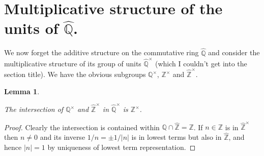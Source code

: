 \documentclass[10pt,a4paper]{article}
\newcommand{\Z}{\mathbb{Z}}
\newcommand{\Q}{\mathbb{Q}}
\newcommand{\Qhat}{\widehat{\Q}}
\newcommand{\Zhat}{\widehat{\Z}}
\newtheorem{lemma}[theorem]{Lemma}
\newcommand{\uses}[1]{}
\newcommand{\lean}[1]{}
\newcommand{\leanok}{}
\begin{document}
\section{Multiplicative structure of the units of \texorpdfstring{$\Qhat$}{Qhat}.}

We now forget the additive structure on the commutative ring $\Qhat$ and consider
the multiplicative structure of its group of units $\Qhat^\times$ (which I couldn't
get into the section title). We have the obvious
subgroups $\Q^\times$, $\Z^\times$ and $\Zhat^\times$.

\begin{lemma}
    \label{Qhat.unitsrat_meet_unitszHat}
    \lean{QHat.unitsrat_meet_unitszHat}
    \uses{QHat,ZHat.commRing}
    \leanok
    The intersection of $\Q^\times$ and $\Zhat^\times$ in $\Qhat^\times$ is $\Z^\times$.
\end{lemma}
\begin{proof}
    \uses{QHat.lowestTerms,QHat.rat_meet_zHat}
    \leanok
    Clearly the intersection is contained within $\Q\cap\Zhat=\Z$. If $n\in\Z$ is in $\Zhat^\times$
    then $n\not=0$ and its inverse $1/n=\pm1/|n|$ is in lowest terms but also in $\Zhat$,
    and hence $|n|=1$ by uniqueness of lowest term representation.
\end{proof}
\end{document}
